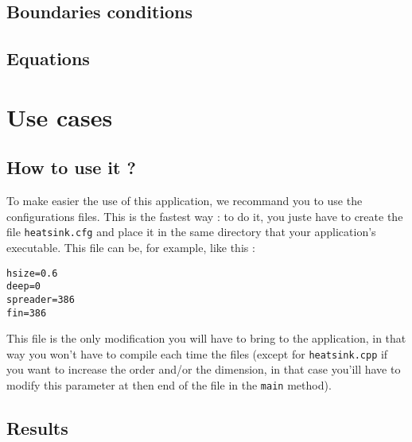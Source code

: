 \subsection{Boundaries conditions}
\label{heat:bc_impl}

\subsection{Equations}
\label{heat:eq_impl}

\section{Use cases}
\subsection{How to use it ?}
To make easier the use of this application, we recommand you to use the configurations files. This is the fastest way : to do it, you juste have to create the file \lstinline!heatsink.cfg! and place it in the same directory that your application's executable. This file can be, for example, like this :
\begin{lstlisting}
hsize=0.6
deep=0
spreader=386
fin=386
\end{lstlisting}
This file is the only modification you will have to bring to the application, in that way you won't have to compile each time the files (except for \lstinline!heatsink.cpp! if you want to increase the order and/or the dimension, in that case you'ill have to modify this parameter at then end of the file in the \lstinline!main! method).

\subsection{Results}
